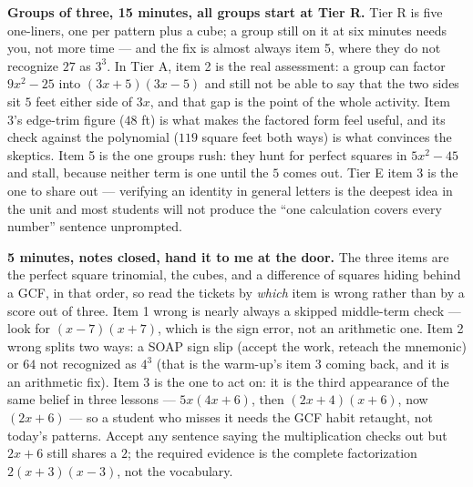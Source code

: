\documentclass[10pt]{article}
\begin{document}
\begin{teachernote}
    \textbf{Groups of three, 15 minutes, all groups start at Tier R.} Tier R is five one-liners, one
    per pattern plus a cube; a group still on it at six minutes needs you, not more time --- and the
    fix is almost always item 5, where they do not recognize $27$ as $3^3$. In Tier A, item 2 is the
    real assessment: a group can factor $9x^2-25$ into $(3x+5)(3x-5)$ and still not be able to say
    that the two sides sit $5$ feet either side of $3x$, and that gap is the point of the whole
    activity. Item 3's edge-trim figure ($48$ ft) is what makes the factored form feel useful, and
    its check against the polynomial ($119$ square feet both ways) is what convinces the skeptics.
    Item 5 is the one groups rush: they hunt for perfect squares in $5x^2-45$ and stall, because
    neither term is one until the $5$ comes out. Tier E item 3 is the one to share out --- verifying
    an identity in general letters is the deepest idea in the unit and most students will not
    produce the ``one calculation covers every number'' sentence unprompted.
\end{teachernote}

\begin{teachernote}
    \textbf{5 minutes, notes closed, hand it to me at the door.} The three items are the perfect
    square trinomial, the cubes, and a difference of squares hiding behind a GCF, in that order, so
    read the tickets by \emph{which} item is wrong rather than by a score out of three. Item 1 wrong
    is nearly always a skipped middle-term check --- look for $(x-7)(x+7)$, which is the sign error,
    not an arithmetic one. Item 2 wrong splits two ways: a SOAP sign slip (accept the work, reteach
    the mnemonic) or $64$ not recognized as $4^3$ (that is the warm-up's item 3 coming back, and it
    is an arithmetic fix). Item 3 is the one to act on: it is the third appearance of the same
    belief in three lessons --- $5x(4x+6)$, then $(2x+4)(x+6)$, now $(2x+6)$ --- so a student who
    misses it needs the GCF habit retaught, not today's patterns. Accept any sentence saying the
    multiplication checks out but $2x+6$ still shares a $2$; the required evidence is the complete
    factorization $2(x+3)(x-3)$, not the vocabulary.
\end{teachernote}
\end{document}

